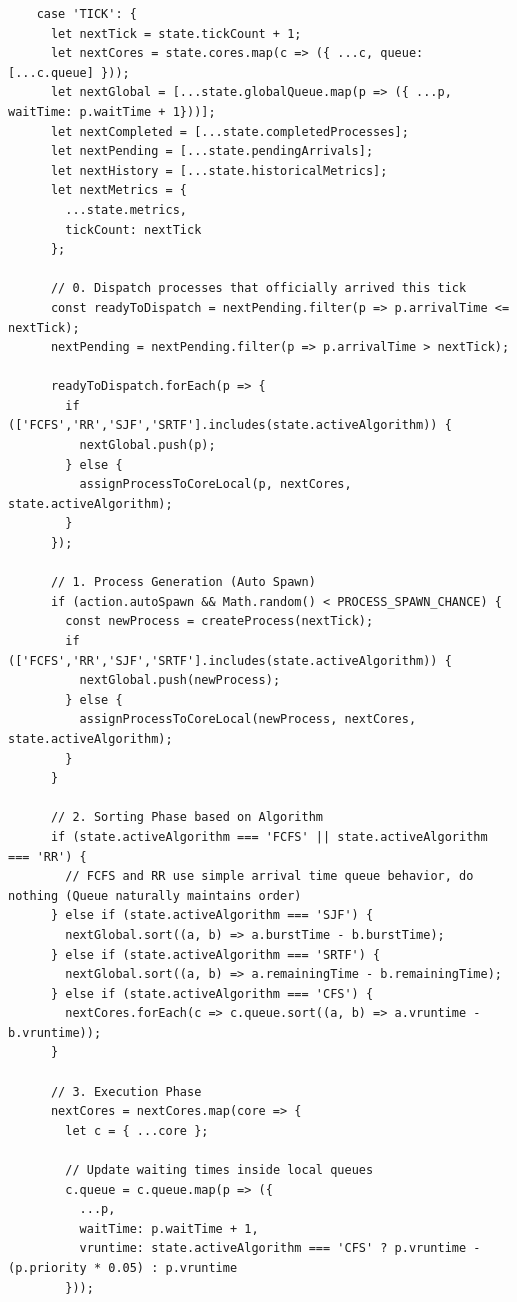 \documentclass[a4paper]{article}
\begin{document}
\begin{lstlisting}
    case 'TICK': {
      let nextTick = state.tickCount + 1;
      let nextCores = state.cores.map(c => ({ ...c, queue: [...c.queue] }));
      let nextGlobal = [...state.globalQueue.map(p => ({ ...p, waitTime: p.waitTime + 1}))];
      let nextCompleted = [...state.completedProcesses];
      let nextPending = [...state.pendingArrivals];
      let nextHistory = [...state.historicalMetrics];
      let nextMetrics = { 
        ...state.metrics, 
        tickCount: nextTick 
      };

      // 0. Dispatch processes that officially arrived this tick
      const readyToDispatch = nextPending.filter(p => p.arrivalTime <= nextTick);
      nextPending = nextPending.filter(p => p.arrivalTime > nextTick);
      
      readyToDispatch.forEach(p => {
        if (['FCFS','RR','SJF','SRTF'].includes(state.activeAlgorithm)) {
          nextGlobal.push(p);
        } else {
          assignProcessToCoreLocal(p, nextCores, state.activeAlgorithm);
        }
      });

      // 1. Process Generation (Auto Spawn)
      if (action.autoSpawn && Math.random() < PROCESS_SPAWN_CHANCE) {
        const newProcess = createProcess(nextTick);
        if (['FCFS','RR','SJF','SRTF'].includes(state.activeAlgorithm)) {
          nextGlobal.push(newProcess);
        } else {
          assignProcessToCoreLocal(newProcess, nextCores, state.activeAlgorithm);
        }
      }

      // 2. Sorting Phase based on Algorithm
      if (state.activeAlgorithm === 'FCFS' || state.activeAlgorithm === 'RR') {
        // FCFS and RR use simple arrival time queue behavior, do nothing (Queue naturally maintains order)
      } else if (state.activeAlgorithm === 'SJF') {
        nextGlobal.sort((a, b) => a.burstTime - b.burstTime); 
      } else if (state.activeAlgorithm === 'SRTF') {
        nextGlobal.sort((a, b) => a.remainingTime - b.remainingTime);
      } else if (state.activeAlgorithm === 'CFS') {
        nextCores.forEach(c => c.queue.sort((a, b) => a.vruntime - b.vruntime));
      }

      // 3. Execution Phase
      nextCores = nextCores.map(core => {
        let c = { ...core };
        
        // Update waiting times inside local queues
        c.queue = c.queue.map(p => ({ 
          ...p, 
          waitTime: p.waitTime + 1,
          vruntime: state.activeAlgorithm === 'CFS' ? p.vruntime - (p.priority * 0.05) : p.vruntime
        }));


\end{lstlisting}
\end{document}
